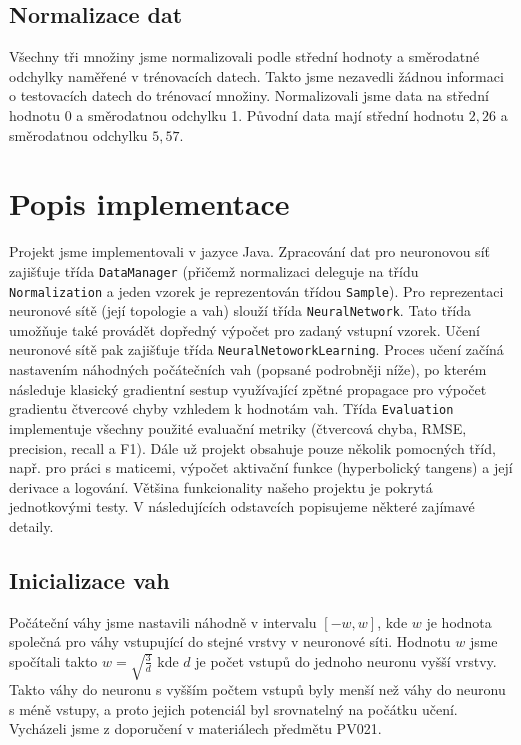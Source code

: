 \documentclass[a4paper, 10pt, twocolumn]{article}
\begin{document}
    \subsection{Normalizace dat}
        Všechny tři množiny jsme normalizovali podle střední hodnoty a směrodatné odchylky naměřené v trénovacích datech. Takto jsme nezavedli žádnou informaci o testovacích datech do trénovací množiny. Normalizovali jsme data na střední hodnotu 0 a směrodatnou odchylku 1. Původní data mají střední hodnotu $2,26$ a směrodatnou odchylku $5,57$.
\section{Popis implementace}
    Projekt jsme implementovali v jazyce Java.
    Zpracování dat pro neuronovou síť zajišťuje třída \texttt{DataManager} (přičemž normalizaci deleguje na třídu \texttt{Normalization} a jeden vzorek je reprezentován třídou \texttt{Sample}).
    Pro reprezentaci neuronové sítě (její topologie a vah) slouží třída \texttt{NeuralNetwork}. Tato třída umožňuje také provádět dopředný výpočet pro zadaný vstupní vzorek.
    Učení neuronové sítě pak zajišťuje třída \texttt{NeuralNetoworkLearning}. Proces učení začíná nastavením náhodných počátečních vah (popsané podrobněji níže), po kterém následuje klasický gradientní sestup využívající zpětné propagace pro výpočet gradientu čtvercové chyby vzhledem k hodnotám vah.
    Třída \texttt{Evaluation} implementuje všechny použité evaluační metriky (čtvercová chyba, RMSE, precision, recall a F1).
    Dále už projekt obsahuje pouze několik pomocných tříd, např. pro práci s maticemi, výpočet aktivační funkce (hyperbolický tangens) a její derivace a logování.
    Většina funkcionality našeho projektu je pokrytá jednotkovými testy.
    V následujících odstavcích popisujeme některé zajímavé detaily.

    \subsection{Inicializace vah}
      Počáteční váhy jsme nastavili náhodně v intervalu $[-w,w]$, kde $w$ je hodnota společná pro váhy vstupující do stejné vrstvy v neuronové síti. Hodnotu $w$ jsme spočítali takto $w = \sqrt{\frac{3}{d}}$ kde $d$ je počet vstupů do jednoho neuronu vyšší vrstvy. Takto váhy do neuronu s vyšším počtem vstupů byly menší než váhy do neuronu s méně vstupy, a proto jejich potenciál byl srovnatelný na počátku učení. Vycházeli jsme z doporučení v materiálech předmětu PV021.
\end{document}
